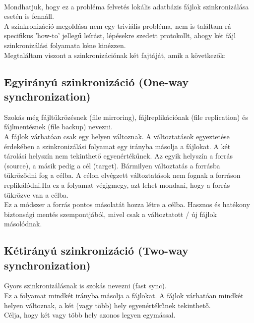 \vspace{5pt} \\ Mondhatjuk, hogy ez a probléma felvetés lokális adatbázis fájlok szinkronizálása esetén is fennáll.
\vspace{15pt} \\ A szinkronizáció megoldása nem egy triviális probléma, nem is találtam rá specifikus 'how-to' jellegű leírást, lépésekre szedett protokollt, ahogy két fájl szinkronizálási folyamata kéne kinézzen.
\\ Megtaláltam viszont a szinkronizációnak két fajtáját, amik a következők:

\subsection{Egyirányú szinkronizáció (One-way synchronization)}
Szokás még fájltükrözésnek (file mirroring), fájlreplikációnak (file replication) és fájlmentésnek (file backup) nevezni.
\vspace{5pt} \\A fájlok várhatóan csak egy helyen változnak. A változtatások egyeztetése érdekében a szinkronizálási folyamat egy irányba másolja a fájlokat. A két tárolási helyszín nem tekinthető egyenértékűnek. Az egyik helyszín a forrás (source), a másik pedig a cél (target). Bármilyen változtatás a forrásba tükröződni fog a célba. A célon elvégzett változtatások nem fognak a forráson replikálódni.Ha ez a folyamat végigmegy, azt lehet mondani, hogy a forrás tükrözve van a célba.
\vspace{5pt} \\Ez a módszer a forrás pontos másolatát hozza létre a célba. Hasznos és hatékony biztonsági mentés szempontjából, mivel csak a változtatott / új fájlok másolódnak.


\subsection{Kétirányú szinkronizáció (Two-way synchronization)}
Gyors szinkronizálásnak is szokás nevezni (fast sync).
\vspace{5pt} \\Ez a folyamat mindkét irányba másolja a fájlokat. A fájlok várhatóan mindkét helyen változnak, a két (vagy több) hely egyenértékűnek tekinthető.
\vspace{5pt} \\Célja, hogy két vagy több hely azonos legyen egymással.
	


